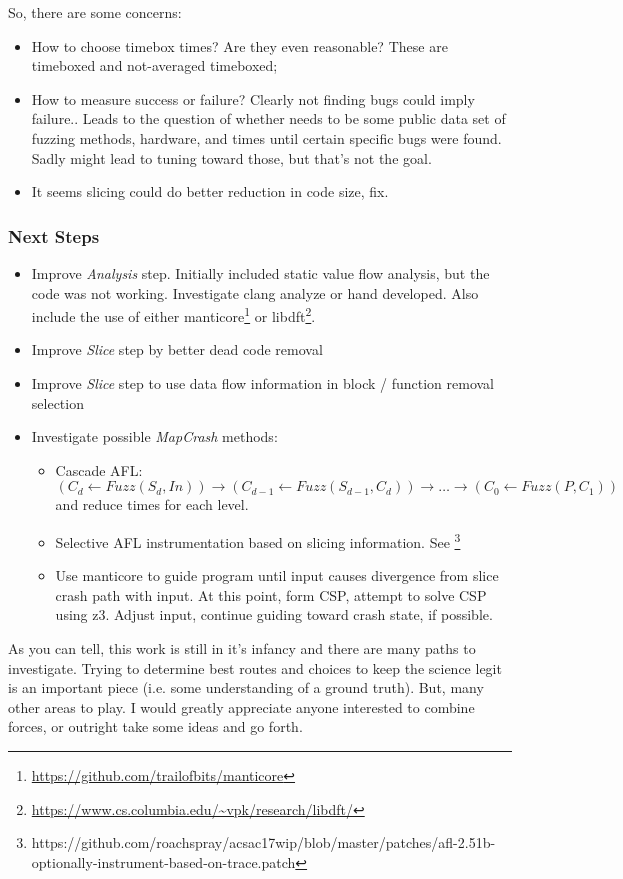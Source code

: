 \documentclass{beamer}
\begin{document}
{	
	So, there are some concerns:
	\begin{itemize}
	\item How to choose timebox times? Are they even reasonable? These are timeboxed and not-averaged timeboxed; 
	\item How to measure success or failure? Clearly not finding bugs could imply failure.. Leads to the question of whether
	needs to be some public data set of fuzzing methods, hardware, and times until certain specific bugs were found. Sadly might lead
	to tuning toward those, but that's not the goal.
	\item It seems slicing could do better reduction in code size, fix.
	\end{itemize}
}

\frame
{
	\frametitle{Next Steps}
	\tiny
	\begin{itemize}
	\item Improve \emph{Analysis} step. Initially included static value flow analysis, but the code was not working. Investigate clang analyze or hand developed. Also include the use of either manticore\footnote{\url{https://github.com/trailofbits/manticore}} or libdft\footnote{\url{https://www.cs.columbia.edu/~vpk/research/libdft/}}.
	\item Improve \emph{Slice} step by better dead code removal
	\item Improve \emph{Slice} step to use data flow information in block / function removal selection
	\item Investigate  possible \emph{MapCrash} methods:
	\begin{itemize}
	\tiny
	\item Cascade AFL: $(C_d \leftarrow Fuzz(S_d, In)) \rightarrow (C_{d-1} \leftarrow Fuzz(S_{d-1}, C_d)) \rightarrow \ldots \rightarrow (C_0 \leftarrow Fuzz(P, C_1))$ \\
	and reduce times for each level.
	
	\item Selective AFL instrumentation based on slicing information. See \footnote{https://github.com/roachspray/acsac17wip/blob/master/patches/afl-2.51b-optionally-instrument-based-on-trace.patch}
	\item Use manticore to guide program until input causes divergence from slice crash path with input. At this point, form CSP, attempt
	to solve CSP using z3. Adjust input, continue guiding toward crash state, if possible. 
	\end{itemize}
	\end{itemize}
	As you can tell, this work is still in it's infancy and there are many paths to investigate. Trying to determine best routes and
	choices to keep the science legit is an important piece (i.e. some understanding of a ground truth). But, many other areas to play.
	I would greatly appreciate anyone interested to combine forces, or outright take some ideas and go forth.
	
}
\end{document}
